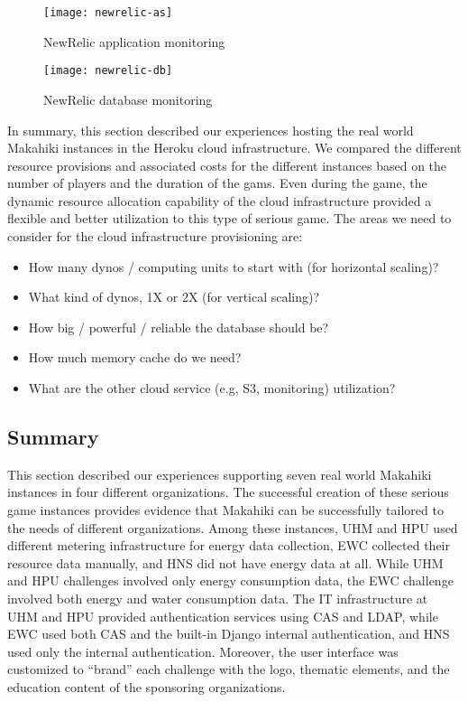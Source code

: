 \begin{figure}[ht!]
  \center
  \texttt{[image: newrelic-as]}
  \caption{NewRelic application monitoring}
  \label{fig:newrelic-as}
\end{figure}

\begin{figure}[ht!]
  \center
  \texttt{[image: newrelic-db]}
  \caption{NewRelic database monitoring}
  \label{fig:newrelic-db}
\end{figure}

In summary, this section described our experiences hosting the real world Makahiki instances in the Heroku cloud infrastructure. We compared the different resource provisions and associated costs for the different instances based on the number of players and the duration of the gams. Even during the game, the dynamic resource allocation capability of the cloud infrastructure provided a flexible and better utilization to this type of serious game. The areas we need to consider for the cloud infrastructure provisioning are:
\begin{itemize}
\item How many dynos / computing units to start with (for horizontal scaling)?
\item What kind of dynos, 1X or 2X (for vertical scaling)? 
\item How big / powerful / reliable the database should be? 
\item How much memory cache do we need?
\item What are the other cloud service (e.g, S3, monitoring) utilization?
\end{itemize}

\subsection{Summary}

This section described our experiences supporting seven real world Makahiki instances in four different organizations. The successful creation of these serious game instances provides evidence that Makahiki can be successfully tailored to the needs of different organizations. Among these instances, UHM and HPU used different metering infrastructure for energy data collection, EWC collected their resource data manually, and HNS did not have energy data at all. While UHM and HPU challenges involved only energy consumption data, the EWC challenge involved both energy and water consumption data. The IT infrastructure at UHM and HPU provided authentication services using CAS and LDAP, while EWC used both CAS and the built-in Django internal  authentication, and HNS used only the internal authentication. Moreover, the user interface was customized to ``brand'' each challenge with the logo, thematic elements, and the education content of the sponsoring organizations.

